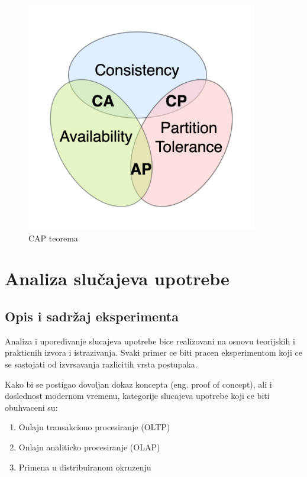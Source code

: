 \documentclass[12pt,oneside]{memoir}
\begin{document}
\begin{figure}[!ht]
  \centering
  \includegraphics[width=0.9\textwidth]{cap.png}
  \caption{CAP teorema}
  \label{fig:grafikon}
\end{figure}

\chapter{Analiza slučajeva upotrebe}
\section{Opis i sadržaj eksperimenta}
Analiza i upoređivanje slucajeva upotrebe bice realizovani na osnovu teorijskih i prakticnih  izvora i istrazivanja. Svaki primer ce biti pracen eksperimentom koji ce se sastojati od izvrsavanja razlicitih vrsta postupaka.

Kako bi se postigao dovoljan dokaz koncepta (eng. proof of concept), ali i doslednost modernom
vremenu, kategorije slucajeva upotrebe koji ce biti obuhvaceni su:
\begin{enumerate}
\item Onlajn transakciono procesiranje (OLTP)
\item Onlajn analiticko procesiranje (OLAP)
\item Primena u distribuiranom okruzenju
\end{enumerate}
\end{document}
